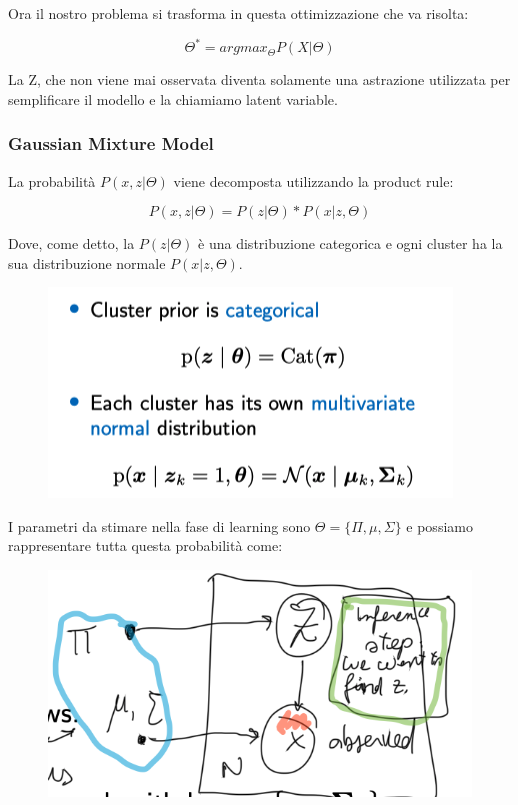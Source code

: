 \documentclass[14pt]{extreport}
\begin{document}
Ora il nostro problema si trasforma in questa ottimizzazione che va risolta:

$$\Theta^{*} = argmax_{\Theta} P(X | \Theta)$$

La Z, che non viene mai osservata diventa solamente una astrazione utilizzata per semplificare il modello e la chiamiamo latent variable.

\subsubsection{Gaussian Mixture Model}

La probabilità $P(x,z|\Theta)$ viene decomposta utilizzando la product rule:

$$P(x,z | \Theta) = P(z|\Theta)*P(x|z,\Theta)$$

Dove, come detto, la $P(z|\Theta)$ è una distribuzione categorica e ogni cluster ha la sua distribuzione normale $P(x|z,\Theta)$.


\begin{figure}[H] 
\centering
\includegraphics[width=0.7\linewidth]{539.jpeg}
\end{figure}

I parametri da stimare nella fase di learning sono $\Theta = \{\Pi, \mu, \Sigma\}$ e possiamo rappresentare tutta questa probabilità come:


\begin{figure}[H] 
\centering
\includegraphics[width=0.7\linewidth]{538.jpeg}
\end{figure}
\end{document}
